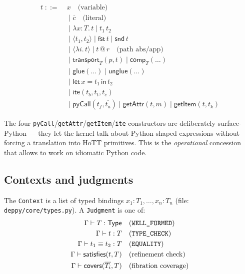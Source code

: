 \begin{align*}
  t \;{::=}\;& x  \quad \text{(variable)}\\
            &{}\mid \overline{c} \quad \text{(literal)}\\
            &{}\mid \lambda x{:}T.\, t \mid t_1\,t_2\\
            &{}\mid \langle t_1, t_2\rangle \mid \mathsf{fst}\,t \mid \mathsf{snd}\,t\\
            &{}\mid \langle\lambda i.\, t\rangle \mid t\,@\,r \quad \text{(path abs/app)}\\
            &{}\mid \mathsf{transport}_T(p, t) \mid \mathsf{comp}_T(\dots) \\
            &{}\mid \mathsf{glue}(\dots) \mid \mathsf{unglue}(\dots) \\
            &{}\mid \mathsf{let}\,x = t_1\,\mathsf{in}\,t_2\\
            &{}\mid \mathsf{ite}(t_b, t_t, t_e)\\
            &{}\mid \mathsf{pyCall}(t_f, \overline{t_a}) \mid \mathsf{getAttr}(t, m) \mid \mathsf{getItem}(t, t_k)
\end{align*}

The four \texttt{pyCall}/\texttt{getAttr}/\texttt{getItem}/\texttt{ite}
constructors are deliberately surface-Python --- they let the kernel
talk about Python-shaped expressions without forcing a translation
into HoTT primitives.  This is the \emph{operational} concession
that allows \Deppy{} to work on idiomatic Python code.

\subsection{Contexts and judgments}

The \texttt{Context} is a list of typed bindings $x_1 : T_1, \dots,
x_n : T_n$ (file: \texttt{deppy/core/types.py}).  A
\texttt{Judgment} is one of:
\begin{align*}
  \Gamma \vdash T : \mathsf{Type}     &\quad\text{(\texttt{WELL\_FORMED})}\\
  \Gamma \vdash t : T                  &\quad\text{(\texttt{TYPE\_CHECK})}\\
  \Gamma \vdash t_1 \equiv t_2 : T     &\quad\text{(\texttt{EQUALITY})}\\
  \Gamma \vdash \mathsf{satisfies}(t, T) &\quad\text{(refinement check)}\\
  \Gamma \vdash \mathsf{covers}(\overline{T_i}, T) &\quad\text{(fibration coverage)}
\end{align*}

